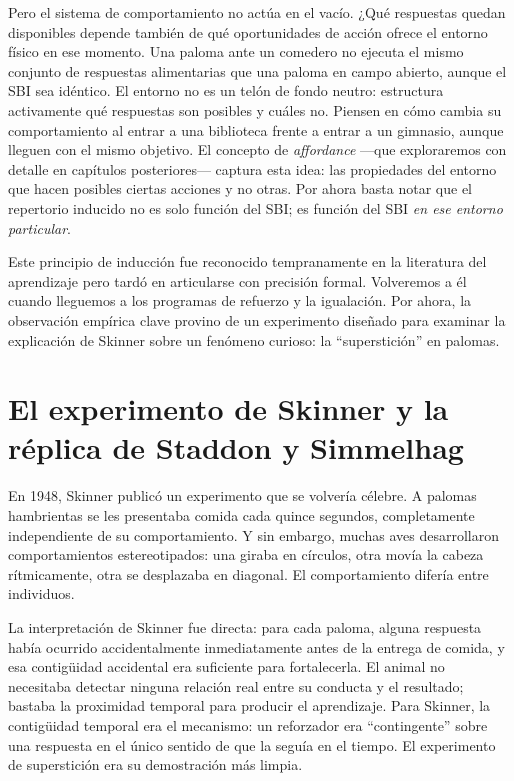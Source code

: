 \documentclass[
  letterpaper,
  DIV=11,
  numbers=noendperiod]{scrreprt}
\begin{document}
\begin{tcolorbox}[enhanced jigsaw, toprule=.15mm, arc=.35mm, colback=white, opacityback=0, colframe=quarto-callout-note-color-frame, breakable, rightrule=.15mm, left=2mm, leftrule=.75mm, bottomrule=.15mm]
Pero el sistema de comportamiento no actúa en el vacío. ¿Qué respuestas
quedan disponibles depende también de qué oportunidades de acción ofrece
el entorno físico en ese momento. Una paloma ante un comedero no ejecuta
el mismo conjunto de respuestas alimentarias que una paloma en campo
abierto, aunque el SBI sea idéntico. El entorno no es un telón de fondo
neutro: estructura activamente qué respuestas son posibles y cuáles no.
Piensen en cómo cambia su comportamiento al entrar a una biblioteca
frente a entrar a un gimnasio, aunque lleguen con el mismo objetivo. El
concepto de \emph{affordance} ---que exploraremos con detalle en
capítulos posteriores--- captura esta idea: las propiedades del entorno
que hacen posibles ciertas acciones y no otras. Por ahora basta notar
que el repertorio inducido no es solo función del SBI; es función del
SBI \emph{en ese entorno particular}.

Este principio de inducción fue reconocido tempranamente en la
literatura del aprendizaje pero tardó en articularse con precisión
formal. Volveremos a él cuando lleguemos a los programas de refuerzo y
la igualación. Por ahora, la observación empírica clave provino de un
experimento diseñado para examinar la explicación de Skinner sobre un
fenómeno curioso: la ``superstición'' en palomas.

\section{El experimento de Skinner y la réplica de Staddon y
Simmelhag}\label{el-experimento-de-skinner-y-la-ruxe9plica-de-staddon-y-simmelhag}

En 1948, Skinner publicó un experimento que se volvería célebre. A
palomas hambrientas se les presentaba comida cada quince segundos,
completamente independiente de su comportamiento. Y sin embargo, muchas
aves desarrollaron comportamientos estereotipados: una giraba en
círculos, otra movía la cabeza rítmicamente, otra se desplazaba en
diagonal. El comportamiento difería entre individuos.

La interpretación de Skinner fue directa: para cada paloma, alguna
respuesta había ocurrido accidentalmente inmediatamente antes de la
entrega de comida, y esa contigüidad accidental era suficiente para
fortalecerla. El animal no necesitaba detectar ninguna relación real
entre su conducta y el resultado; bastaba la proximidad temporal para
producir el aprendizaje. Para Skinner, la contigüidad temporal era el
mecanismo: un reforzador era ``contingente'' sobre una respuesta en el
único sentido de que la seguía en el tiempo. El experimento de
superstición era su demostración más limpia.


\end{tcolorbox}
\end{document}
